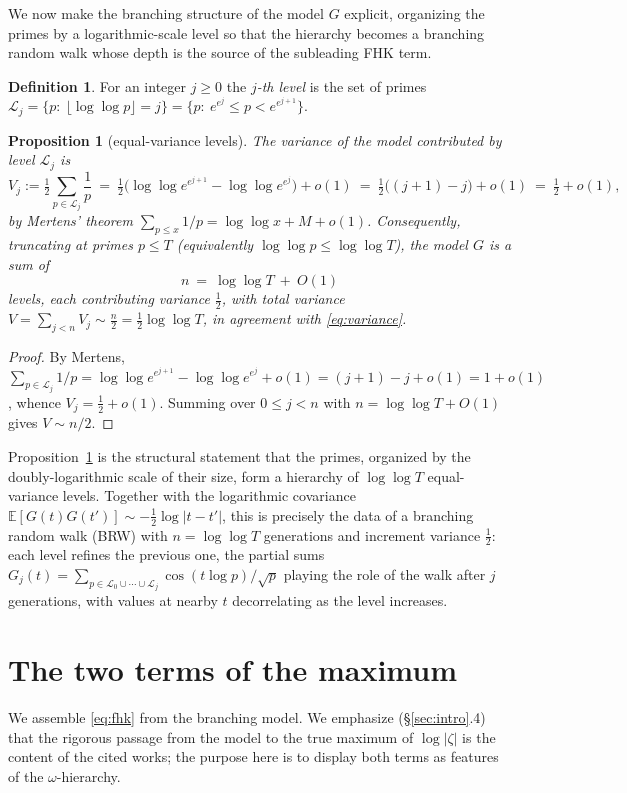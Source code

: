 \documentclass[11pt]{amsart}
\newtheorem{proposition}[theorem]{Proposition}
\theoremstyle{definition}
\newtheorem{definition}[theorem]{Definition}
\newcommand{\Ee}{\mathbb E}
\newcommand{\half}{\tfrac12}
\newcommand{\loglog}{\log\log}
\begin{document}
We now make the branching structure of the model $G$ explicit, organizing the primes by a logarithmic-scale
level so that the hierarchy becomes a branching random walk whose depth is the source of the subleading FHK term.

\begin{definition}
For an integer $j\ge0$ the \emph{$j$-th level} is the set of primes
$\mathcal L_j=\{p:\ \lfloor\loglog p\rfloor=j\}=\{p:\ e^{e^{j}}\le p<e^{e^{j+1}}\}$.
\end{definition}

\begin{proposition}[equal-variance levels]\label{prop:levels}
The variance of the model contributed by level $\mathcal L_j$ is
\[
V_j:=\half\sum_{p\in\mathcal L_j}\frac1p\ =\ \half\bigl(\loglog e^{e^{j+1}}-\loglog e^{e^{j}}\bigr)+o(1)\ =\ \half\bigl((j+1)-j\bigr)+o(1)\ =\ \half+o(1),
\]
by Mertens' theorem $\sum_{p\le x}1/p=\loglog x+M+o(1)$. Consequently, truncating at primes $p\le T$
(equivalently $\loglog p\le\loglog T$), the model $G$ is a sum of
\[
n\ =\ \loglog T\ +\ O(1)
\]
levels, each contributing variance $\half$, with total variance $V=\sum_{j<n}V_j\sim\tfrac n2=\half\loglog T$, in
agreement with \eqref{eq:variance}.
\end{proposition}
\begin{proof}
By Mertens, $\sum_{p\in\mathcal L_j}1/p=\loglog e^{e^{j+1}}-\loglog e^{e^{j}}+o(1)=(j+1)-j+o(1)=1+o(1)$, whence
$V_j=\half+o(1)$. Summing over $0\le j<n$ with $n=\loglog T+O(1)$ gives $V\sim n/2$.
\end{proof}

Proposition~\ref{prop:levels} is the structural statement that the primes, organized by the doubly-logarithmic
scale of their size, form a hierarchy of $\loglog T$ equal-variance levels. Together with the logarithmic
covariance $\Ee[G(t)G(t')]\sim-\half\log|t-t'|$, this is precisely the data of a branching random walk (BRW) with
$n=\loglog T$ generations and increment variance $\half$: each level refines the previous one, the partial sums
$G_j(t)=\sum_{p\in\mathcal L_0\cup\cdots\cup\mathcal L_j}\cos(t\log p)/\sqrt p$ playing the role of the walk after
$j$ generations, with values at nearby $t$ decorrelating as the level increases.

\section{The two terms of the maximum}\label{sec:max}

We assemble \eqref{eq:fhk} from the branching model. We emphasize (\S\ref{sec:intro}.4) that the rigorous passage
from the model to the true maximum of $\log|\zeta|$ is the content of the cited works; the purpose here is to
display both terms as features of the $\omega$-hierarchy.
\end{document}
